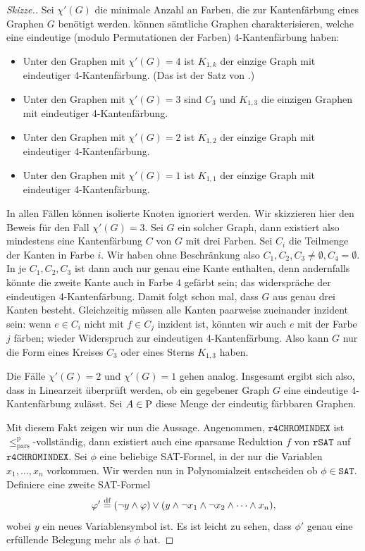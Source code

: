 \begin{proof}[Skizze.]
    Sei $\chi'(G)$ die minimale Anzahl an Farben, die zur Kantenfärbung eines Graphen $G$ benötigt werden.
    \citeauthor{cai_complexity_2020} können  
    sämtliche Graphen charakterisieren, welche eine eindeutige (modulo Permutationen der Farben) 4-Kantenfärbung haben:
    \begin{itemize}[nosep,beginpenalty=0]
        \item Unter den Graphen mit $\chi'(G)=4$ ist $K_{1,k}$ der einzige Graph mit eindeutiger 4-Kantenfärbung. (Das ist der Satz von \cite{thomason_hamiltonian_1978}.)
        \item Unter den Graphen mit $\chi'(G)=3$ sind $C_3$ und $K_{1,3}$ die einzigen Graphen mit eindeutiger 4-Kantenfärbung.
        \item Unter den Graphen mit $\chi'(G)=2$ ist $K_{1,2}$ der einzige Graph mit eindeutiger 4-Kantenfärbung.
        \item Unter den Graphen mit $\chi'(G)=1$ ist $K_{1,1}$ der einzige Graph mit eindeutiger 4-Kantenfärbung.
    \end{itemize}
    In allen Fällen können isolierte Knoten ignoriert werden. Wir skizzieren hier den Beweis für den Fall $\chi'(G)=3$. Sei $G$ ein solcher Graph, dann existiert also mindestens eine Kantenfärbung $C$ von $G$ mit drei Farben. Sei $C_i$ die Teilmenge der Kanten in Farbe $i$.
    Wir haben ohne Beschränkung also $C_1,C_2,C_3\neq\emptyset, C_4=\emptyset$.
    In je $C_1,C_2,C_3$ ist dann auch nur genau eine Kante enthalten, denn andernfalls könnte die zweite Kante auch in Farbe $4$ gefärbt sein; das widerspräche der eindeutigen 4-Kantenfärbung.
    Damit folgt schon mal, dass $G$ aus genau drei Kanten besteht.
    Gleichzeitig müssen alle Kanten paarweise zueinander inzident sein: wenn $e\in C_i$ nicht mit $f\in C_j$ inzident ist, könnten wir auch $e$ mit der Farbe $j$ färben; wieder Widerspruch zur eindeutigen 4-Kantenfärbung.
    Also kann $G$ nur die Form eines Kreises $C_3$ oder eines Sterns $K_{1,3}$ haben.

    Die Fälle $\chi'(G)=2$ und $\chi'(G)=1$ gehen analog.
    Insgesamt ergibt sich also, dass in Linearzeit überprüft werden, ob ein gegebener Graph $G$ eine eindeutige 4-Kantenfärbung zulässt. Sei $A\in \P$ diese Menge der eindeutig färbbaren Graphen.

    Mit diesem Fakt zeigen wir nun die Aussage.
    Angenommen, $\mathtt{r4CHROMINDEX}$ ist $\leq_\mathrm{pars}^\mathrm p$-vollständig, dann existiert auch eine sparsame Reduktion $f$ von $\mathtt{rSAT}$ auf $\mathtt{r4CHROMINDEX}$.
    Sei $\phi$ eine beliebige SAT-Formel, in der nur die Variablen $x_1, \dots, x_n$ vorkommen.
    Wir werden nun in Polynomialzeit entscheiden ob $\phi\in \mathtt{SAT}$. 
    Definiere eine zweite SAT-Formel
    \[ \phi' \defeq (\neg y \land \phi) \lor (y\land \neg x_1 \land \neg x_2 \land\cdots\land x_n), \]
    wobei $y$ ein neues Variablensymbol ist. Es ist leicht zu sehen, dass $\phi'$ genau eine erfüllende Belegung mehr als $\phi$ hat.


\end{proof}
